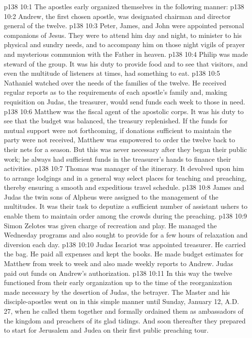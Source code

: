 \vs p138 10:1 The apostles early organized themselves in the following manner:
\vs p138 10:2 \bibnobreakspace Andrew, the first chosen apostle, was designated chairman and director general of the twelve.
\vs p138 10:3 \bibnobreakspace Peter, James, and John were appointed personal companions of Jesus. They were to attend him day and night, to minister to his physical and sundry needs, and to accompany him on those night vigils of prayer and mysterious communion with the Father in heaven.
\vs p138 10:4 \bibnobreakspace Philip was made steward of the group. It was his duty to provide food and to see that visitors, and even the multitude of listeners at times, had something to eat.
\vs p138 10:5 \bibnobreakspace Nathaniel watched over the needs of the families of the twelve. He received regular reports as to the requirements of each apostle’s family and, making requisition on Judas, the treasurer, would send funds each week to those in need.
\vs p138 10:6 \bibnobreakspace Matthew was the fiscal agent of the apostolic corps. It was his duty to see that the budget was balanced, the treasury replenished. If the funds for mutual support were not forthcoming, if donations sufficient to maintain the party were not received, Matthew was empowered to order the twelve back to their nets for a season. But this was never necessary after they began their public work; he always had sufficient funds in the treasurer’s hands to finance their activities.
\vs p138 10:7 \bibnobreakspace Thomas was manager of the itinerary. It devolved upon him to arrange lodgings and in a general way select places for teaching and preaching, thereby ensuring a smooth and expeditious travel schedule.
\vs p138 10:8 \bibnobreakspace James and Judas the twin sons of Alpheus were assigned to the management of the multitudes. It was their task to deputize a sufficient number of assistant ushers to enable them to maintain order among the crowds during the preaching.
\vs p138 10:9 \bibnobreakspace Simon Zelotes was given charge of recreation and play. He managed the Wednesday programs and also sought to provide for a few hours of relaxation and diversion each day.
\vs p138 10:10 \bibnobreakspace Judas Iscariot was appointed treasurer. He carried the bag. He paid all expenses and kept the books. He made budget estimates for Matthew from week to week and also made weekly reports to Andrew. Judas paid out funds on Andrew’s authorization.
\vs p138 10:11 \pc In this way the twelve functioned from their early organization up to the time of the reorganization made necessary by the desertion of Judas, the betrayer. The Master and his disciple\hyp{}apostles went on in this simple manner until Sunday, January 12, A.D.\,27, when he called them together and formally ordained them as ambassadors of the kingdom and preachers of its glad tidings. And soon thereafter they prepared to start for Jerusalem and Judea on their first public preaching tour.
\quizlink
